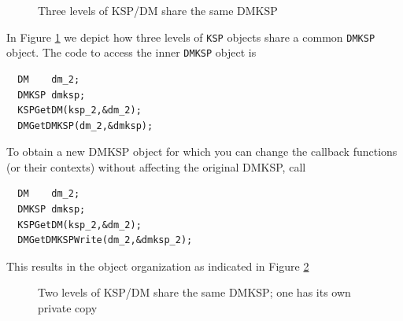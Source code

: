 \begin{figure}[hbt]
\centering
{}
  \caption{Three levels of KSP/DM share the same DMKSP}
\label{fig_dmksp}
\end{figure}

In Figure \ref{fig_dmksp} we depict how three levels of \lstinline{KSP} objects share a common \lstinline{DMKSP} object. The code to access the inner \lstinline{DMKSP} object is
\begin{lstlisting}
  DM    dm_2;
  DMKSP dmksp;
  KSPGetDM(ksp_2,&dm_2);
  DMGetDMKSP(dm_2,&dmksp);
\end{lstlisting}
To obtain a new DMKSP object for which you can change the callback functions (or their contexts) without affecting the original DMKSP, call
\begin{lstlisting}
  DM    dm_2;
  DMKSP dmksp;
  KSPGetDM(ksp_2,&dm_2);
  DMGetDMKSPWrite(dm_2,&dmksp_2);
\end{lstlisting}
This results in the object organization as indicated in Figure \ref{fig_dmksp2}

\begin{figure}[hbt]
\centering
{}
  \caption{Two levels of KSP/DM share the same DMKSP; one has its own private copy}
\label{fig_dmksp2}
\end{figure}

